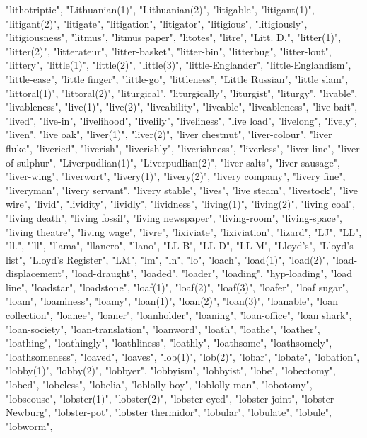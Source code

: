"lithotriptic",
"Lithuanian(1)",
"Lithuanian(2)",
"litigable",
"litigant(1)",
"litigant(2)",
"litigate",
"litigation",
"litigator",
"litigious",
"litigiously",
"litigiousness",
"litmus",
"litmus paper",
"litotes",
"litre",
"Litt. D.",
"litter(1)",
"litter(2)",
"litterateur",
"litter-basket",
"litter-bin",
"litterbug",
"litter-lout",
"littery",
"little(1)",
"little(2)",
"little(3)",
"little-Englander",
"little-Englandism",
"little-ease",
"little finger",
"little-go",
"littleness",
"Little Russian",
"little slam",
"littoral(1)",
"littoral(2)",
"liturgical",
"liturgically",
"liturgist",
"liturgy",
"livable",
"livableness",
"live(1)",
"live(2)",
"liveability",
"liveable",
"liveableness",
"live bait",
"lived",
"live-in",
"livelihood",
"livelily",
"liveliness",
"live load",
"livelong",
"lively",
"liven",
"live oak",
"liver(1)",
"liver(2)",
"liver chestnut",
"liver-colour",
"liver fluke",
"liveried",
"liverish",
"liverishly",
"liverishness",
"liverless",
"liver-line",
"liver of sulphur",
"Liverpudlian(1)",
"Liverpudlian(2)",
"liver salts",
"liver sausage",
"liver-wing",
"liverwort",
"livery(1)",
"livery(2)",
"livery company",
"livery fine",
"liveryman",
"livery servant",
"livery stable",
"lives",
"live steam",
"livestock",
"live wire",
"livid",
"lividity",
"lividly",
"lividness",
"living(1)",
"living(2)",
"living coal",
"living death",
"living fossil",
"living newspaper",
"living-room",
"living-space",
"living theatre",
"living wage",
"livre",
"lixiviate",
"lixiviation",
"lizard",
"LJ",
"LL",
"ll.",
"'ll",
"llama",
"llanero",
"llano",
"LL B",
"LL D",
"LL M",
"Lloyd's",
"Lloyd's list",
"Lloyd's Register",
"LM",
"lm",
"ln",
"lo",
"loach",
"load(1)",
"load(2)",
"load-displacement",
"load-draught",
"loaded",
"loader",
"loading",
"hyp-loading",
"load line",
"loadstar",
"loadstone",
"loaf(1)",
"loaf(2)",
"loaf(3)",
"loafer",
"loaf sugar",
"loam",
"loaminess",
"loamy",
"loan(1)",
"loan(2)",
"loan(3)",
"loanable",
"loan collection",
"loanee",
"loaner",
"loanholder",
"loaning",
"loan-office",
"loan shark",
"loan-society",
"loan-translation",
"loanword",
"loath",
"loathe",
"loather",
"loathing",
"loathingly",
"loathliness",
"loathly",
"loathsome",
"loathsomely",
"loathsomeness",
"loaved",
"loaves",
"lob(1)",
"lob(2)",
"lobar",
"lobate",
"lobation",
"lobby(1)",
"lobby(2)",
"lobbyer",
"lobbyism",
"lobbyist",
"lobe",
"lobectomy",
"lobed",
"lobeless",
"lobelia",
"loblolly boy",
"loblolly man",
"lobotomy",
"lobscouse",
"lobster(1)",
"lobster(2)",
"lobster-eyed",
"lobster joint",
"lobster Newburg",
"lobster-pot",
"lobster thermidor",
"lobular",
"lobulate",
"lobule",
"lobworm",
